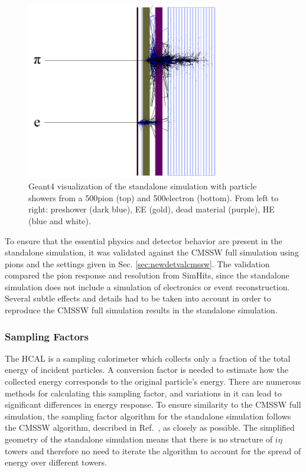 \begin{figure}[hbtp]
\begin{center}
\includegraphics[width=0.75\textwidth]{figures/showers-labeled.png}
\caption{Geant4 visualization of the standalone simulation with particle showers from a 500\GeV pion (top) and 500\GeV electron (bottom). From left to right: preshower (dark blue), EE (gold), dead material (purple), HE (blue and white).}
\label{fig:showers}
\end{center}
\end{figure}

To ensure that the essential physics and detector behavior are present in the standalone simulation, it was validated against the CMSSW full simulation using pions and the settings given in Sec. \ref{sec:newdetvalcmssw}. The validation compared the pion response and resolution from SimHits, since the standalone simulation does not include a simulation of electronics or event reconstruction. Several subtle effects and details had to be taken into account in order to reproduce the CMSSW full simulation results in the standalone simulation.

\subsubsection{Sampling Factors}
\label{sec:newdetvalsam}

The HCAL is a sampling calorimeter which collects only a fraction of the total energy of incident particles. A conversion factor is needed to estimate how the collected energy corresponds to the original particle's energy. There are numerous methods for calculating this sampling factor, and variations in it can lead to significant differences in energy response. To ensure similarity to the CMSSW full simulation, the sampling factor algorithm for the standalone simulation follows the CMSSW algorithm, described in Ref.~\cite{hcalsam}, as closely as possible. The simplified geometry of the standalone simulation means that there is no structure of $i\eta$ towers and therefore no need to iterate the algorithm to account for the spread of energy over different towers.

